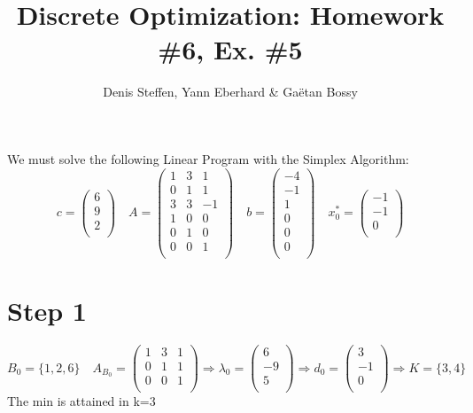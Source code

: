 \documentclass[a4paper,11pt,french]{article}
\title{Discrete Optimization: Homework \#6, Ex. \#5}
\author{Denis Steffen, Yann Eberhard \& Gaëtan Bossy}
\begin{document}
    
    \maketitle
    We must solve the following Linear Program with the Simplex Algorithm:
    \begin{displaymath}
    c=\left(\begin{array}{c} 6\\ 9\\ 2\\ \end{array}\right)\quad A=\left(
\begin{array}{ccc}
1 & 3 & 1\\
0 & 1 & 1 \\
3 & 3 & -1\\
1 & 0 & 0\\
0 & 1 & 0\\
0 & 0 & 1\\
\end{array}
\right) \quad b=\left(\begin{array}{c}-4\\-1\\1\\0\\0\\0\\ \end{array}\right)\quad x_{0}^*=\left(\begin{array}{c}-1\\-1\\0\\\end{array}\right)
  \end{displaymath}
  \section{Step 1}
  \begin{displaymath}
  B_0=\{1,2,6\}\quad A_{B_0}=\left(
\begin{array}{ccc}
1 & 3 & 1\\
0 & 1 & 1 \\
0 & 0 & 1\\
\end{array}
\right) \Rightarrow \lambda_0=\left(\begin{array}{c} 6\\ -9\\ 5\\ \end{array}\right)\Rightarrow d_0=\left(\begin{array}{c} 3\\ -1\\ 0\\ \end{array}\right)\Rightarrow K=\{3,4\}
   \end{displaymath}
   The min is attained in k=3
\end{document}
